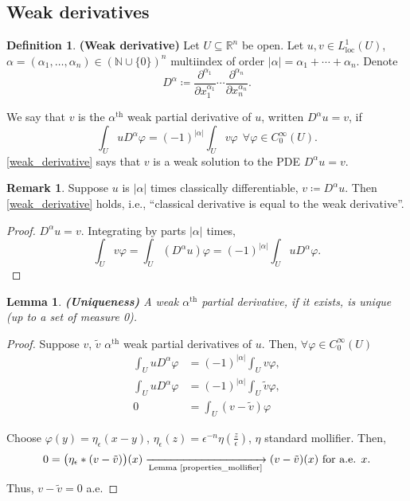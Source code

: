 \documentclass[12pt]{article}
\newtheorem{lemma}{Lemma}[section]
\theoremstyle{definition}
\newtheorem{definition}{Definition}[section]
\newtheorem*{remark}{Remark}
\begin{document}
\subsection{Weak derivatives}
\begin{definition}
\textbf{(Weak derivative)} Let $U\subseteq\mathbb R^n$ be open. Let $u,v\in L_\text{loc}^1(U)$, $\alpha=(\alpha_1,\ldots,\alpha_n)\in(\mathbb N\cup\{0\})^n$ multiindex of order $|\alpha|=\alpha_1+\cdots+\alpha_n$. Denote
\[D^\alpha\coloneqq\frac{\partial^{\alpha_1}}{\partial x_1^{\alpha_1}}\cdots\frac{\partial^{\alpha_n}}{\partial x_n^{\alpha_n}}.\]

We say that $v$ is the $\alpha^\text{th}$ weak partial derivative of $u$, written $D^\alpha u=v$, if
\begin{equation}\tag{$*$}\label{weak_derivative}
\int_UuD^\alpha\varphi=(-1)^{|\alpha|}\int_Uv\varphi\ \ \forall\varphi\in C_0^\infty(U).
\end{equation}
\eqref{weak_derivative} says that $v$ is a weak solution to the PDE $D^\alpha u=v$.
\end{definition}

\begin{remark}
Suppose $u$ is $|\alpha|$ times classically differentiable, $v\coloneqq D^\alpha u$. Then \eqref{weak_derivative} holds, i.e., ``classical derivative is equal to the weak derivative''.
\end{remark}

\begin{proof}
$D^\alpha u=v$. Integrating by parts $|\alpha|$ times,
\[\int_Uv\varphi=\int_U(D^\alpha u)\varphi=(-1)^{|\alpha|}\int_UuD^\alpha\varphi.\]
\end{proof}

\begin{lemma}
\emph{\textbf{(Uniqueness)}} A weak $\alpha^\text{th}$ partial derivative, if it exists, is unique (up to a set of measure 0).
\end{lemma}

\begin{proof}
Suppose $v$, $\tilde v$ $\alpha^\text{th}$ weak partial derivatives of $u$. Then, $\forall\varphi\in C_0^\infty(U)$
\begin{align*}
\int_UuD^\alpha\varphi&=(-1)^{|\alpha|}\int_Uv\varphi,\\
\int_UuD^\alpha\varphi&=(-1)^{|\alpha|}\int_U\tilde v\varphi,\\
0&=\int_U(v-\tilde v)\varphi
\end{align*}

Choose $\varphi(y)=\eta_\epsilon(x-y)$, $\eta_\epsilon(z)=\epsilon^{-n}\eta(\frac z\epsilon)$, $\eta$ standard mollifier. Then,
\[0=\big(\eta_\epsilon*(v-\tilde v)\big)(x)\xrightarrow[\text{Lemma \ref{properties_mollifier}}]{}(v-\tilde v)(x)\text{ for a.e. }x.\]
Thus, $v-\tilde v=0$ a.e.
\end{proof}
\end{document}
